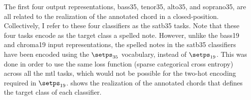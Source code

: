 The first four output representations, \gls{bass35},
\gls{tenor35}, \gls{alto35}, and \gls{soprano35}, are all
related to the realization of the annotated chord in a
\gls{closed-position}. Collectively, I refer to these four
classifiers as the \gls{satb35} tasks. Note that these four
tasks encode as the target class a spelled note. However,
unlike the \gls{bass19} and \gls{chroma19} input
representations, the spelled notes in the \gls{satb35}
classifiers have been encoded using the $\setps_{35}$
vocabulary, instead of $\setps_{19}$. This was done in order
to use the same loss function (sparse categorical cross
entropy) across all the \gls{mtl} tasks, which would not be
possible for the two-hot encoding required in $\setps_{19}$.
 shows the realization of the annotated
chords that defines the target class of each classifier.

